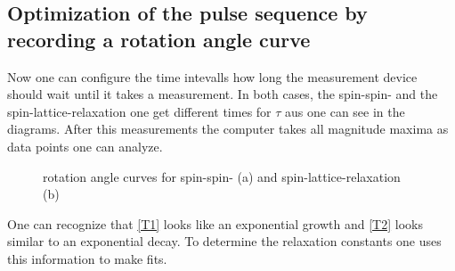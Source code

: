     \subsection{Optimization of the pulse sequence by recording a rotation angle curve}
    \label{task_3}
    Now one can configure the time intevalls how long the measurement device should wait until it takes a measurement. In both cases, the spin-spin- and the spin-lattice-relaxation one get different times for $\tau$ aus one can see in the diagrams.
    After this measurements the computer takes all magnitude maxima as data points one can analyze.
           \begin{figure}[h]
               \centering
               \caption{rotation angle curves for spin-spin- (a) and spin-lattice-relaxation (b) }     
           \end{figure}
    One can recognize that \ref{T1} looks like an exponential growth and \ref{T2} looks similar to an exponential decay. To determine the relaxation constants one uses this information to make fits.        
